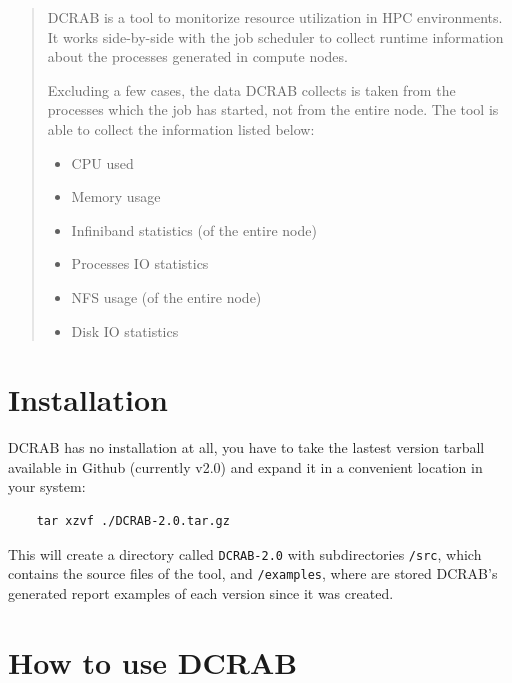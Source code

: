 \documentclass[10pt,a4paper]{report}
\begin{document}

\begin{abstract}

DCRAB is a tool to monitorize resource utilization in HPC environments. It works side-by-side with the job scheduler to collect runtime information about the processes generated in compute nodes.

Excluding a few cases, the data DCRAB collects is taken from the processes which the job has started, not from the entire node. The tool is able to collect the information listed below:

\begin{itemize}
	\item CPU used
	\item Memory usage
	\item Infiniband statistics (of the entire node)
	\item Processes IO statistics
	\item NFS usage (of the entire node)
	\item Disk IO statistics
\end{itemize}

\end{abstract}


\tableofcontents


\chapter{Installation}

DCRAB has no installation at all, you have to take the lastest version tarball available in Github (currently v2.0) and expand it in a convenient location in your system:

\begin{verbatim}
    tar xzvf ./DCRAB-2.0.tar.gz
\end{verbatim}

This will create a directory called \verb+DCRAB-2.0+ with subdirectories \verb+/src+, which contains the source files of the tool, and \verb+/examples+, where are stored DCRAB's generated report examples of each version since it was created.

\chapter{How to use DCRAB}
\end{document}
